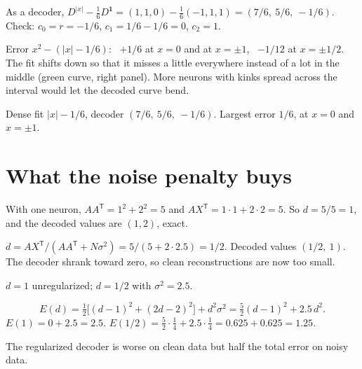 \documentclass[11pt,letterpaper]{article}
\newcommand{\T}{\mathsf T}
\newcommand{\ans}[1]{\par\vspace{4pt}{\bfseries #1}\quad}
\begin{document}
As a decoder, $D^{|x|} - \tfrac16 D^{\mathbf 1} = (1, 1, 0) - \tfrac16(-1, 1, 1) = (7/6,\ 5/6,\ -1/6)$. Check: $c_0 = r = -1/6$, $c_1 = 1/6 - 1/6 = 0$, $c_2 = 1$.

Error $x^2 - (|x| - 1/6)$: \ $+1/6$ at $x = 0$ and at $x = \pm 1$, \ $-1/12$ at $x = \pm 1/2$. The fit shifts down so that it misses a little everywhere instead of a lot in the middle (green curve, right panel). More neurons with kinks spread across the interval would let the decoded curve bend.
\begin{result}
Dense fit $|x| - 1/6$, decoder $(7/6,\ 5/6,\ -1/6)$. Largest error $1/6$, at $x = 0$ and $x = \pm1$.
\end{result}

\section{What the noise penalty buys}

\ans{(a)}
With one neuron, $AA^\T = 1^2 + 2^2 = 5$ and $AX^\T = 1\cdot 1 + 2 \cdot 2 = 5$. So $d = 5/5 = 1$, and the decoded values are $(1, 2)$, exact.

\ans{(b)}
$d = AX^\T / (AA^\T + N\sigma^2) = 5 / (5 + 2 \cdot 2.5) = 1/2$. Decoded values $(1/2,\ 1)$. The decoder shrank toward zero, so clean reconstructions are now too small.
\begin{result}
$d = 1$ unregularized; $d = 1/2$ with $\sigma^2 = 2.5$.
\end{result}

\ans{(c)}
\[
E(d) = \tfrac12\big[(d - 1)^2 + (2d - 2)^2\big] + d^2\sigma^2 = \tfrac52 (d - 1)^2 + 2.5\, d^2 .
\]
$E(1) = 0 + 2.5 = 2.5$. \quad $E(1/2) = \tfrac52\cdot\tfrac14 + 2.5\cdot\tfrac14 = 0.625 + 0.625 = 1.25$.

The regularized decoder is worse on clean data but half the total error on noisy data.
\end{document}
